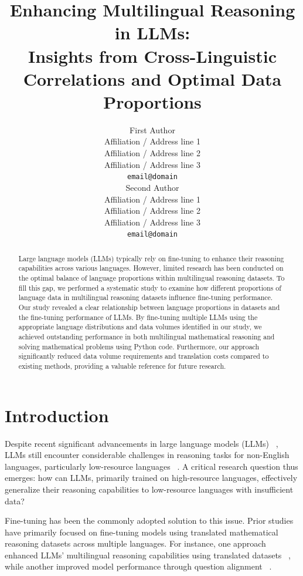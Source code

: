\documentclass[11pt]{article}
\title{Enhancing Multilingual Reasoning in LLMs: \\
Insights from Cross-Linguistic Correlations and Optimal Data Proportions}
\author{First Author \\
  Affiliation / Address line 1 \\
  Affiliation / Address line 2 \\
  Affiliation / Address line 3 \\
  \texttt{email@domain} \\\And
  Second Author \\
  Affiliation / Address line 1 \\
  Affiliation / Address line 2 \\
  Affiliation / Address line 3 \\
  \texttt{email@domain} \\}
\begin{document}
\maketitle
\begin{abstract}
Large language models (LLMs) typically rely on fine-tuning to enhance their reasoning capabilities across various languages. However, limited research has been conducted on the optimal balance of language proportions within multilingual reasoning datasets. To fill this gap, we performed a systematic study to examine how different proportions of language data in multilingual reasoning datasets influence fine-tuning performance. Our study revealed a clear relationship between language proportions in datasets and the fine-tuning performance of LLMs. By fine-tuning multiple LLMs using the appropriate language distributions and data volumes identified in our study, we achieved outstanding performance in both multilingual mathematical reasoning and solving mathematical problems using Python code. Furthermore, our approach significantly reduced data volume requirements and translation costs compared to existing methods, providing a valuable reference for future research.
\end{abstract}

\section{Introduction}

Despite recent significant advancements in large language models (LLMs) ~\citep{openai2023gpt4,chowdhery2023palm,touvron2023llama,brown2020languagemodelsfewshotlearners,workshop2023bloom176bparameteropenaccessmultilingual}, LLMs still encounter considerable challenges in reasoning tasks for non-English languages, particularly low-resource languages ~\citep{shi2022language,huang2023not,qin2023cross}. A critical research question thus emerges: how can LLMs, primarily trained on high-resource languages, effectively generalize their reasoning capabilities to low-resource languages with insufficient data? 

Fine-tuning has been the commonly adopted solution to this issue. Prior studies have primarily focused on fine-tuning models using translated mathematical reasoning datasets across multiple languages. For instance, one approach enhanced LLMs’ multilingual reasoning capabilities using translated datasets ~\citep{chen2023breakinglanguagebarriersmultilingual}, while another improved model performance through question alignment ~\citep{zhu2024question,zhu2024power}.
\end{document}

